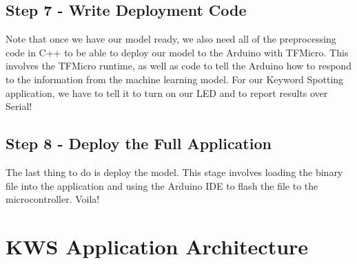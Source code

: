   \subsection{Step 7 - Write Deployment Code}
  
 Note that once we have our model ready, we also need all of the preprocessing code in C++ to be able to deploy our model to the Arduino with TFMicro. This involves the TFMicro runtime, as well as code to tell the Arduino how to respond to the information from the machine learning model. For our Keyword Spotting application, we have to tell it to turn on our LED and to report results over Serial!
 
  \subsection{Step 8 - Deploy the Full Application}
  
 The last thing to do is deploy the model. This stage involves loading the binary file into the application and using the Arduino IDE to flash the file to the microcontroller. Voila!
 
 \section{KWS Application Architecture}
 
